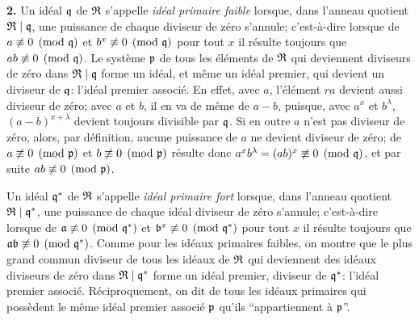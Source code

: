 \textbf{2.} Un idéal $\mathfrak{q}$ de $\mathfrak{R}$ s'appelle \emph{idéal primaire faible} lorsque, dans l'anneau quotient $\mathfrak{R}\mid\mathfrak{q}$, une puissance de chaque diviseur de zéro s'annule; c'est-à-dire lorsque de $a\not\equiv0\pmod{\mathfrak{q}}$ et $b^x\not\equiv0\pmod{\mathfrak{q}}$ pour tout $x$ il résulte toujours que $ab\not\equiv0\pmod{\mathfrak{q}}$. Le système $\mathfrak{p}$ de tous les éléments de $\mathfrak{R}$ qui deviennent diviseurs de zéro dans $\mathfrak{R}\mid\mathfrak{q}$ forme un idéal, et même un idéal premier, qui devient un diviseur de $\mathfrak{q}$: l'idéal premier associé. En effet, avec $a$, l'élément $ra$ devient aussi diviseur de zéro; avec $a$ et $b$, il en va de même de $a-b$, puisque, avec $a^x$ et $b^\lambda$, $(a-b)^{x+\lambda}$ devient toujours divisible par $\mathfrak{q}$. Si en outre $a$ n'est pas diviseur de zéro, alors, par définition, aucune puissance de $a$ ne devient diviseur de zéro; de $a\not\equiv0\pmod{\mathfrak{p}}$ et $b\not\equiv0\pmod{\mathfrak{p}}$ résulte donc $a^x b^\lambda=(ab)^x\not\equiv0\pmod{\mathfrak{q}}$, et par suite $ab\not\equiv0\pmod{\mathfrak{p}}$.

Un idéal $\mathfrak{q}^*$ de $\mathfrak{R}$ s'appelle \emph{idéal primaire fort} lorsque, dans l'anneau quotient $\mathfrak{R}\mid\mathfrak{q}^*$, une puissance de chaque idéal diviseur de zéro s'annule; c'est-à-dire lorsque de $\mathfrak{a}\not\equiv0\pmod{\mathfrak{q}^*}$ et $\mathfrak{b}^x\not\equiv0\pmod{\mathfrak{q}^*}$ pour tout $x$ il résulte toujours que $\mathfrak{a}\mathfrak{b}\not\equiv0\pmod{\mathfrak{q}^*}$. Comme pour les idéaux primaires faibles, on montre que le plus grand commun diviseur de tous les idéaux de $\mathfrak{R}$ qui deviennent des idéaux diviseurs de zéro dans $\mathfrak{R}\mid\mathfrak{q}^*$ forme un idéal premier, diviseur de $\mathfrak{q}^*$: l'idéal premier associé. Réciproquement, on dit de tous les idéaux primaires qui possèdent le même idéal premier associé $\mathfrak{p}$ qu'ils ``appartiennent à $\mathfrak{p}$''.

